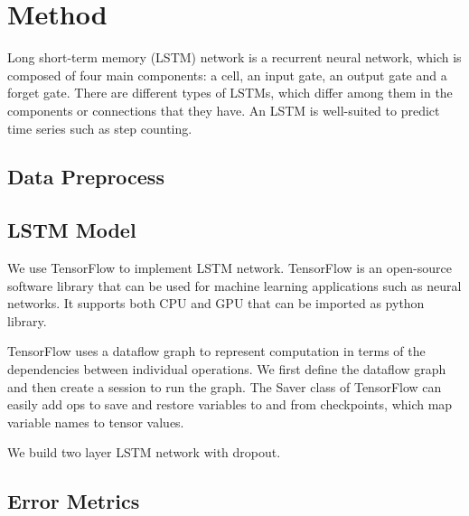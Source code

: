 \documentclass[11pt]{article}
\begin{document}
\section{Method}
Long short-term memory (LSTM) network is a recurrent neural network, which is composed of four main components: a cell, an input gate, an output gate and a forget gate. There are different types of LSTMs, which differ among them in the components or connections that they have. An LSTM is well-suited to predict time series such as step counting.

\subsection{Data Preprocess}

\subsection{LSTM Model}
We use TensorFlow to implement LSTM network. TensorFlow is an open-source software library that can be used for machine learning applications such as neural networks. It supports both CPU and GPU that can be imported as python library.

TensorFlow uses a dataflow graph to represent computation in terms of the dependencies between individual operations. We first define the dataflow graph and then create a session to run the graph. The Saver class of TensorFlow can easily add ops to save and restore variables to and from checkpoints, which map variable names to tensor values.

We build two layer LSTM network with dropout.



 

\subsection{Error Metrics}
\end{document}
